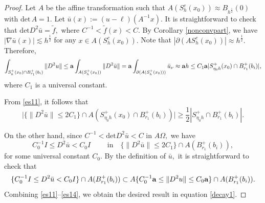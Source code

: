 \documentclass[11pt]{amsart}
\theoremstyle{plain}
\renewcommand{\det}{\mbox{det}}
\newcommand{\0}{\textbf{0}}
\numberwithin{equation}{section}
\numberwithin{equation}{section}
\numberwithin{figure}{section}
\begin{document}
	\begin{proof}
		
		Let $A$ be the affine transformation such that $A\left(S^c_h(x_0)\right)\approx B_{h^{\frac{1}{2}}}(0)$ with $\det\, A=1.$ 
		Let $\bar{u}(x):=(u-\ell)(A^{-1}x).$ It is straightforward to check that $\det D^2\bar{u}=\tilde{f},$ where $C^{-1}<\tilde{f}(x)<C.$
		By  Corollary \ref{nonconvpart},  we have $|\nabla\bar{u}(x)|\lesssim h^{\frac{1}{2}}$ for any $x\in  A(S^c_h(x_0)).$ 
		Note that $|\partial (AS^c_h(x_0))|\approx h^{\frac{1}{2}}.$
		Therefore, 
		\begin{equation}\label{es11}
			\int_{S^+_h(x_0)\cap B^{+}_{r_1}(b_i)}\|D^2u\|\leq {\bf a}\int_{A(S^+_h(x_0))}\|D^2\bar{u}\|={\bf a}\int_{\partial (A(S^+_h(x_0)))}\bar{u}_\nu\approx {\bf a} h\leq C_1{\bf a}|S^+_{\eta_0 h}(x_0)\cap B^{+}_{r_1}(b_i)|,
		\end{equation}
		where $C_1$ is a universal constant.
		
		From \eqref{es11}, it follows that 
		\begin{equation}\label{es12}
			\big|\{\|D^2\bar{u}\|\leq 2C_1\}\cap A(S^+_{\eta_0 h}(x_0)\cap B^{+}_{r_1}(b_i))\big|\geq \frac{1}{2}|S^+_{\eta_0 h}\cap B^{+}_{r_1}(b_i)|.
		\end{equation}
	
	On the other hand, since $C^{-1}<\det D^2\bar{u}<C$ in $A\Omega,$ we have 
	\begin{equation}\label{es13}
		C_0^{-1} I\leq D^2\bar{u}<C_0I\qquad \text{ in}\quad \{\|D^2\bar{u}\|\leq 2C_1\}\cap A (B^{+}_{r_1}(b_i)),
	\end{equation}
	for some universal constant $C_0.$ By the definition of $\bar{u},$ it is straightforward to check that
	\begin{equation}\label{es14}
		\{C_0^{-1}I\leq D^2\bar{u}<C_0I\}\cap A (B^{+}_{r_1}(b_i)) \subset A\{C_0^{-1}{\bf a}\leq \|D^2u\|\leq C_0{\bf a}\}\cap A (B^{+}_{r_1}(b_i)).
	\end{equation}
	Combining \eqref{es11}--\eqref{es14}, we obtain the desired result in equation \eqref{decay1}.
\end{proof}
\end{document}
